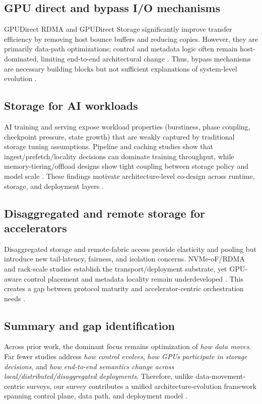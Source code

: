 \subsection{GPU direct and bypass I/O mechanisms}

GPUDirect RDMA and GPUDirect Storage significantly improve transfer efficiency by removing host bounce buffers and reducing copies. However, they are primarily data-path optimizations; control and metadata logic often remain host-dominated, limiting end-to-end architectural change \cite{nvidia_gdrdma,nvidia_gds_blog,nvidia_gds_overview,nvidia_gds_best_practices}. Thus, bypass mechanisms are necessary building blocks but not sufficient explanations of system-level evolution \cite{pcie_spec,infiniband_spec,nvmeof_spec}.

\subsection{Storage for AI workloads}

AI training and serving expose workload properties (burstiness, phase coupling, checkpoint pressure, state growth) that are weakly captured by traditional storage tuning assumptions. Pipeline and caching studies show that ingest/prefetch/locality decisions can dominate training throughput, while memory-tiering/offload designs show tight coupling between storage policy and model scale \cite{murray2021tfdata,hoard2018,rajbhandari2021zeroinfinity}. These findings motivate architecture-level co-design across runtime, storage, and deployment layers \cite{hdf5gds2020,geminifs2025,kwon2023vllm,zhong2024distserve}.

\subsection{Disaggregated and remote storage for accelerators}

Disaggregated storage and remote-fabric access provide elasticity and pooling but introduce new tail-latency, fairness, and isolation concerns. NVMe-oF/RDMA and rack-scale studies establish the transport/deployment substrate, yet GPU-aware control placement and metadata locality remain underdeveloped \cite{nvmeof_spec,infiniband_spec,liu2017rackscale}. This creates a gap between protocol maturity and accelerator-centric orchestration needs \cite{qureshi2023bam,nvidia_gdrdma}.

\subsection{Summary and gap identification}

Across prior work, the dominant focus remains optimization of \emph{how data moves}. Far fewer studies address \emph{how control evolves}, \emph{how GPUs participate in storage decisions}, and \emph{how end-to-end semantics change across local/distributed/disaggregated deployments}. Therefore, unlike data-movement-centric surveys, our survey contributes a unified architecture-evolution framework spanning control plane, data path, and deployment model \cite{traub2023compstoragesurvey,zhang2025hpcstoragesurvey,qureshi2023bam,geminifs2025}.
